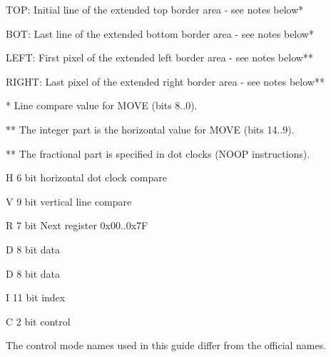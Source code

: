 \documentclass[11pt]{book}
\def\lthtmlcheckvsize{\ifdim\ht\sizebox<\vsize 
  \ifdim\wd\sizebox<\hsize\expandafter\hfill\fi \expandafter\vfill
  \else\expandafter\vss\fi}%
\begin{document}
{\newpage\clearpage
{}%
\begin{table}\centering\small
  
\par
\raggedright TOP: Initial line of the extended top border area - see notes below*
\par
BOT: Last line of the extended bottom border area - see notes below*
\par
LEFT: First pixel of the extended left border area - see notes below**
\par
RIGHT: Last pixel of the extended right border area - see notes below**
\par
* Line compare value for MOVE (bits 8..0).
\par
** The integer part is the horizontal value for MOVE (bits 14..9).
\par
** The fractional part is specified in dot clocks (NOOP instructions).
\end{table}%
\lthtmlfigureZ
\lthtmlcheckvsize\clearpage}

{\newpage\clearpage
{}%
\begin{table}\centering
  
\par
\raggedright H   6 bit horizontal dot clock compare
\par
V   9 bit vertical line compare
\par
R   7 bit Next register 0x00..0x7F
\par
D   8 bit data
\end{table}%
\lthtmlfigureZ
\lthtmlcheckvsize\clearpage}

{\newpage\clearpage
{}%
\begin{table}\centering
  
\par
\raggedright D    8 bit data
\par
I   11 bit index 
\par
C   2 bit control
\end{table}%
\lthtmlfigureZ
\lthtmlcheckvsize\clearpage}

{\newpage\clearpage
{}%
\begin{table}\centering
  
\par
\raggedright * The control mode names used in this guide differ from
  the official names.
\end{table}%
\lthtmlfigureZ
\lthtmlcheckvsize\clearpage}
\end{document}
